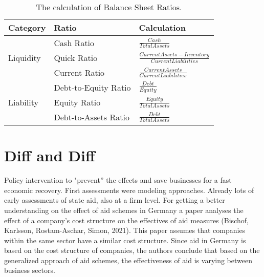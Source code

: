 \begin{table}[]
    \caption{The calculation of Balance Sheet Ratios.}
    \label{tab:RatioCalc}
    \centering
    \def\arraystretch{1.5}
    \begin{tabular}{@{}lll@{}}
    \toprule
    Category                   & Ratio                & Calculation \\ \midrule
    \multirow{3}{*}{Liquidity} & Cash Ratio           & $\frac{Cash}{Total Assets}$ \\ %
                                & Quick Ratio          & $\frac{Current Assets-Inventory}{Current Liabilities}$ \\ %
                                & Current Ratio        & $\frac{Current Assets}{Current Liabilities}$ \\ \midrule
    \multirow{3}{*}{Liability} & Debt-to-Equity Ratio & $\frac{Debt}{Equity}$ \\ %
                                & Equity Ratio         & $\frac{Equity}{Total Assets}$ \\ %
                                & Debt-to-Assets Ratio & $\frac{Debt}{Total Assets}$ \\ \bottomrule
    \end{tabular}
    \end{table}


\section{Diff and Diff}

Policy intervention to "prevent” the effects and save businesses for a fast economic recovery.
First assessments were modeling approaches.
Already lots of early assessments of state aid, also at a firm level.
For getting a better understanding on the effect of aid schemes in Germany a paper analyses the effect of a company’s cost structure on the effectives of aid measures (Bischof, Karlsson, Rostam-Aschar, Simon, 2021). 
This paper assumes that companies within the same sector have a similar cost structure. 
Since aid in Germany is based on the cost structure of companies, the authors conclude that based on the generalized approach of aid schemes, the effectiveness of aid is varying between business sectors.


